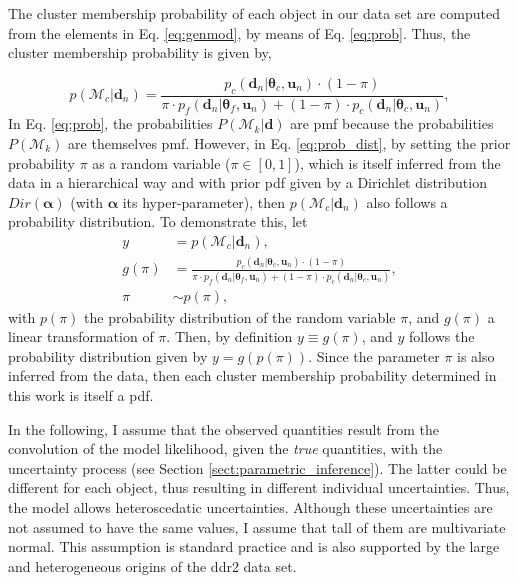 The cluster membership probability of each object in our data set are computed from the elements in Eq. \ref{eq:genmod}, by means of Eq. \ref{eq:prob}. Thus, the cluster membership probability is given by,

\begin{equation}
\label{eq:prob_dist}
p( \mathcal{M}_c | \mathbf{d}_n) =\frac{p_c(\mathbf{d}_n| \boldsymbol{\theta}_c,\mathbf{u}_n)\cdot (1-\pi)}{\pi \cdot p_f(\mathbf{d}_n|\boldsymbol{\theta}_f,\mathbf{u}_n) + (1-\pi)\cdot p_c(\mathbf{d}_n| \boldsymbol{\theta}_c,\mathbf{u}_n)},
\end{equation}
In Eq. \ref{eq:prob}, the probabilities $P( \mathcal{M}_k | \mathbf{d})$ are \gls{pmf} because the probabilities $P( \mathcal{M}_k )$ are themselves \gls{pmf}. However, in Eq. \ref{eq:prob_dist}, by setting the prior probability $\pi$ as a random variable ($\pi \in [0,1]$), which is itself inferred from the data in a hierarchical way and with prior \gls{pdf} given by a Dirichlet distribution $Dir(\boldsymbol{\alpha})$ (with $\boldsymbol{\alpha}$ its hyper-parameter), then $p(\mathcal{M}_c | \mathbf{d}_n)$ also follows a probability distribution. To demonstrate this, let 
\begin{align}
y&= p( \mathcal{M}_c | \mathbf{d}_n),\nonumber \\
g(\pi)&= \frac{p_c(\mathbf{d}_n| \boldsymbol{\theta}_c,\mathbf{u}_n)\cdot (1-\pi)}{\pi \cdot p_f(\mathbf{d}_n|\boldsymbol{\theta}_f,\mathbf{u}_n) + (1-\pi)\cdot p_c(\mathbf{d}_n| \boldsymbol{\theta}_c,\mathbf{u}_n)},\nonumber \\
\pi &\sim p(\pi),\nonumber
\end{align}
with $p(\pi)$ the probability distribution of the random variable $\pi$, and $g(\pi)$ a linear transformation of $\pi$.
Then, by definition $y \equiv g(\pi)$, and $y$ follows the probability distribution given by $y= g(p(\pi))$. Since the parameter $\pi$ is also inferred from the data, then each cluster membership probability determined in this work is itself a \gls{pdf}. 



In the following, I assume that the observed quantities result from the convolution of the model likelihood, given the \emph{true} quantities, with the uncertainty process (see Section \ref{sect:parametric_inference}). The latter could be different for each object, thus resulting in different individual uncertainties. Thus, the model allows heteroscedatic uncertainties. Although these uncertainties are not assumed to have the same values, I assume that tall of them are multivariate normal.  This assumption is standard practice and is also supported by the large and heterogeneous origins of the \gls{ddr2} data set. 

